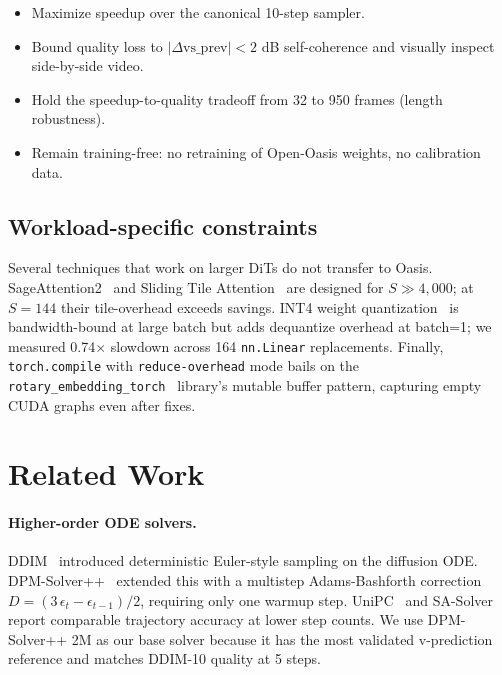 \documentclass[10pt,letterpaper,twocolumn]{article}
\begin{document}
\begin{itemize}
\item Maximize speedup over the canonical 10-step sampler.
\item Bound quality loss to $|\Delta \text{vs\_prev}| < 2$ dB self-coherence and visually inspect side-by-side video.
\item Hold the speedup-to-quality tradeoff from 32 to 950 frames (length robustness).
\item Remain training-free: no retraining of Open-Oasis weights, no calibration data.
\end{itemize}

\subsection{Workload-specific constraints}

Several techniques that work on larger DiTs do not transfer to Oasis. SageAttention2~\citep{zhang2025sageattn} and Sliding Tile Attention~\citep{xie2025sta} are designed for $S \gg 4{,}000$; at $S=144$ their tile-overhead exceeds savings. INT4 weight quantization~\citep{torchao2024} is bandwidth-bound at large batch but adds dequantize overhead at batch=1; we measured 0.74$\times$ slowdown across 164 \texttt{nn.Linear} replacements. Finally, \texttt{torch.compile} with \texttt{reduce-overhead} mode bails on the \texttt{rotary\_embedding\_torch}~\citep{rotary2023} library's mutable buffer pattern, capturing empty CUDA graphs even after fixes.

\section{Related Work}

\paragraph{Higher-order ODE solvers.} DDIM~\citep{song2020ddim} introduced deterministic Euler-style sampling on the diffusion ODE. DPM-Solver++~\citep{lu2022dpmsolverpp} extended this with a multistep Adams-Bashforth correction $D = (3\,\epsilon_t - \epsilon_{t-1})/2$, requiring only one warmup step. UniPC~\citep{zhao2023unipc} and SA-Solver~\citep{xue2023sasolver} report comparable trajectory accuracy at lower step counts. We use DPM-Solver++ 2M as our base solver because it has the most validated v-prediction reference and matches DDIM-10 quality at 5 steps.
\end{document}
